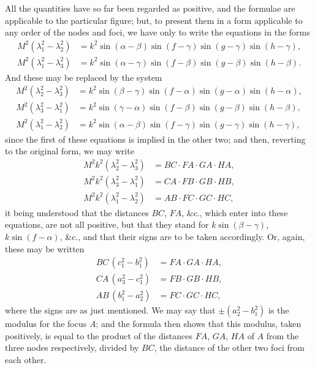 \documentclass[11pt]{article}
\begin{document}
All the quantities have so far been regarded as positive, and the formulae are applicable to the particular figure; but, to present them in a form applicable to any order of the nodes and foci, we have only to write the equations in the forms
\begin{align*}
M^2(\lambda_1^2 - \lambda_2^2) &= k^2 \sin(\alpha - \beta)\sin(f - \gamma)\sin(g - \gamma)\sin(h - \gamma),\\
M^2(\lambda_1^2 - \lambda_3^2) &= k^2 \sin(\alpha - \gamma)\sin(f - \beta)\sin(g - \beta)\sin(h - \beta).
\end{align*}
And these may be replaced by the system
\begin{align*}
M^2(\lambda_2^2 - \lambda_3^2) &= k^2 \sin(\beta - \gamma)\sin(f - \alpha)\sin(g - \alpha)\sin(h - \alpha),\\
M^2(\lambda_3^2 - \lambda_1^2) &= k^2 \sin(\gamma - \alpha)\sin(f - \beta)\sin(g - \beta)\sin(h - \beta),\\
M^2(\lambda_1^2 - \lambda_2^2) &= k^2 \sin(\alpha - \beta)\sin(f - \gamma)\sin(g - \gamma)\sin(h - \gamma),
\end{align*}
since the first of these equations is implied in the other two; and then, reverting to the original form, we may write
\begin{align*}
M^2 k^2(\lambda_2^2 - \lambda_3^2) &= BC\cdot FA\cdot GA\cdot HA,\\
M^2 k^2(\lambda_3^2 - \lambda_1^2) &= CA\cdot FB\cdot GB\cdot HB,\\
M^2 k^2(\lambda_1^2 - \lambda_2^2) &= AB\cdot FC\cdot GC\cdot HC,
\end{align*}
it being understood that the distances $BC$, $FA$, \&c., which enter into these equations, are not all positive, but that they stand for $k\sin(\beta - \gamma)$, $k\sin(f - \alpha)$, \&c., and that their signs are to be taken accordingly. Or, again, these may be written
\begin{align*}
BC\,(c_1^2 - b_1^2) &= FA\cdot GA\cdot HA,\\
CA\,(a_3^2 - c_1^2) &= FB\cdot GB\cdot HB,\\
AB\,(b_1^2 - a_2^2) &= FC\cdot GC\cdot HC,
\end{align*}
where the signs are as just mentioned. We may say that $\pm (a_2^2 - b_1^2)$ is the modulus for the focus $A$; and the formula then shows that this modulus, taken positively, is equal to the product of the distances $FA$, $GA$, $HA$ of $A$ from the three nodes respectively, divided by $BC$, the distance of the other two foci from each other.
\end{document}
